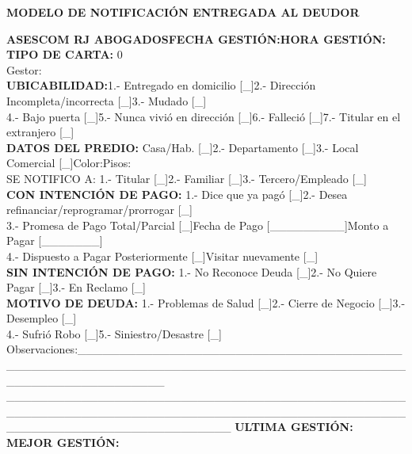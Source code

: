 \begin{center}
\textbf{ MODELO DE NOTIFICACIÓN ENTREGADA AL DEUDOR}
\end{center}
{\noindent
\textbf{ASESCOM RJ ABOGADOS}\hfill \textbf{FECHA GESTIÓN:}\hfill \textbf{HORA GESTIÓN:}\hfill \space\\         \textbf{TIPO DE CARTA:} {0}\\
Gestor:\\
\textbf{UBICABILIDAD:}\hfill 1.- Entregado en domicilio [\_]\hfill 2.- Dirección Incompleta/incorrecta [\_]\hfill 3.- Mudado [\_]\hfill \space\\
4.- Bajo puerta [\_]\hfill 5.- Nunca vivió en dirección [\_]\hfill 6.- Falleció [\_]\hfill 7.- Titular en el extranjero [\_]\hfill \space\\
\textbf{DATOS DEL PREDIO:} Casa/Hab. [\_]\hfill 2.- Departamento [\_]\hfill 3.- Local Comercial [\_]\hfill Color:\hfill Pisos:\hfill \space\\
SE NOTIFICO A: 1.- Titular [\_]\hfill 2.- Familiar [\_]\hfill 3.- Tercero/Empleado [\_]\hfill \space\\ 	
\textbf{CON INTENCIÓN DE PAGO:} 1.- Dice que ya pagó [\_]\hfill 2.- Desea refinanciar/reprogramar/prorrogar [\_]\hfill \space\\
3.- Promesa de Pago Total/Parcial [\_]\hfill Fecha de Pago [\_\_\_\_\_\_\_\_\_]\hfill Monto a Pagar [\_\_\_\_\_\_\_]\hfill \space\\
4.- Dispuesto a Pagar Posteriormente [\_]\hfill Visitar nuevamente [\_]\hfill \space\\
\textbf{SIN INTENCIÓN DE PAGO:} 1.- No Reconoce Deuda [\_]\hfill 2.- No Quiere Pagar [\_]\hfill 3.- En Reclamo [\_]\hfill \space\\
\textbf{MOTIVO DE DEUDA:} 1.- Problemas de Salud [\_]\hfill 2.- Cierre de Negocio [\_]\hfill 3.- Desempleo [\_]\hfill \space\\
4.- Sufrió Robo [\_]\hfill 5.- Siniestro/Desastre [\_]\hfill \space\\
Observaciones:\_\_\_\_\_\_\_\_\_\_\_\_\_\_\_\_\_\_\_\_\_\_\_\_\_\_\_\_\_\_\_\_\_\_\_\_\_\_\_\_\_\_\_\_\_\_\_\_\_\_\_\_\_\_\_\_\_\_\_\_\_\_\_\_\_\_\_\_\_\_\_\_\_\_\_\_\_\_\_\_\_\_\_\_\_\_\_\_\_\_\_\_\_\_\_\_\_\_\_\_\_\_\_\_\_\_\\
\_\_\_\_\_\_\_\_\_\_\_\_\_\_\_\_\_\_\_\_\_\_\_\_\_\_\_\_\_\_\_\_\_\_\_\_\_\_\_\_\_\_\_\_\_\_\_\_\_\_\_\_\_\_\_\_\_\_\_\_\_\_\_\_\_\_\_\_\_\_\_\_\_\_\_\_\_\_\_\_\_\_\_\_\_\_\_\_\_\_\_\_\_\_\_\_\_\_\_\_\_\_\_\_\_\_\_\_\_\_\_\_\_\_\_\_\_\_\_\_\_\_\_
\textbf{ULTIMA GESTIÓN:}\\
\textbf{MEJOR GESTIÓN:}
}









